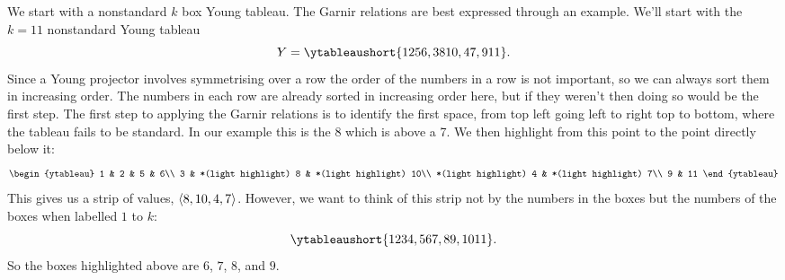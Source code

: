 \documentclass[fleqn]{NotesClass}
\DeclarePairedDelimiter{\tuple}{\langle}{\rangle}
\begin{document}
    We start with a nonstandard \(k\) box Young tableau.
    The Garnir relations are best expressed through an example.
    We'll start with the \(k = 11\) nonstandard Young tableau
    \begin{equation}
        Y = \ytableaushort{1256,38{10},47,9{11}}.
    \end{equation}
    Since a Young projector involves symmetrising over a row the order of the numbers in a row is not important, so we can always sort them in increasing order.
    The numbers in each row are already sorted in increasing order here, but if they weren't then doing so would be the first step.
    The first step to applying the Garnir relations is to identify the first space, from top left going left to right top to bottom, where the tableau fails to be standard.
    In our example this is the 8 which is above a 7.
    We then highlight from this point to the point directly below it:
    \begin{equation}
        \begin{ytableau}
            1 & 2 & 5 & 6\\
            3 & *(light highlight) 8 & *(light highlight) 10\\
            *(light highlight) 4 & *(light highlight) 7\\
            9 & 11
        \end{ytableau}
    \end{equation}
    This gives us a strip of values, \(\tuple{8,10,4,7}\).
    However, we want to think of this strip not by the numbers in the boxes but the numbers of the boxes when labelled \(1\) to \(k\):
    \begin{equation}
        \ytableaushort{1234,567,89,{10}{11}}.
    \end{equation}
    So the boxes highlighted above are \(6\), \(7\), \(8\), and \(9\).
    
\end{document}
